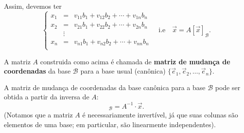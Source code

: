 Assim, devemos ter
\begin{equation}
\left\{
\begin{array}{lcl}
x_1 &=& v_{11} b_{1} + v_{12} b_{2} + \cdots + v_{1n} b_{n} \\
x_2 &=& v_{21} b_{1} + v_{22} b_{2} + \cdots + v_{2n} b_{n} \\
&\vdots& \\
x_n &=& v_{n1} b_{1} + v_{n2} b_{2} + \cdots + v_{nn} b_{n} \\
\end{array}
\right. \quad \text{i.e} \quad \vec{x} = A [\vec{x}]_{\mathcal{B}}.
\end{equation}

A matriz $A$ construida como acima é chamada de \textbf{matriz de mudança de coordenadas} da base $\mathcal{B}$ para a base usual (canônica) $\{ \vec{e}_1, \vec{e}_2, \dots, \vec{e}_n\}$.

A matriz de mudança de coordenadas da base canônica para a base $\mathcal{B}$ pode ser obtida a partir da inversa de $A$:
\begin{equation}
[\vec{x}]_{\mathcal{B}} = A^{-1} \cdot \vec{x}.
\end{equation} (Notamos que a matriz $A$ é necessariamente invertível, já que suas colunas são elementos de uma base; em particular, são linearmente independentes).

